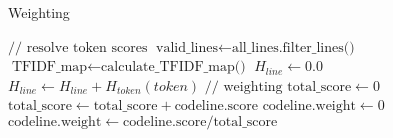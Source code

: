 \begin{algorithm}
\caption{Weighting}
\label{alg:weight}
\begin{algorithmic}[1]
    \State $\text{// resolve token scores}$
    \State $\text{valid\_lines} \gets \text{all\_lines.filter\_lines()}$
    \State $\text{TFIDF\_map} \gets \text{calculate\_TFIDF\_map()}$
        \State $H_{line} \gets 0.0$
            \State $H_{line} \gets H_{line} + H_{token}(token)$
        \EndFor
    \EndFor
    \State $\text{// weighting}$
    \State $\text{total\_score} \gets 0$
        \State $\text{total\_score} \gets \text{total\_score} + \text{codeline.score}$
    \EndFor
            \State $\text{codeline.weight} \gets 0$
        \Else
            \State $\text{codeline.weight} \gets \text{codeline.score} / \text{total\_score}$
        \EndIf
    \EndFor
\EndFunction
\end{algorithmic}
\end{algorithm}

